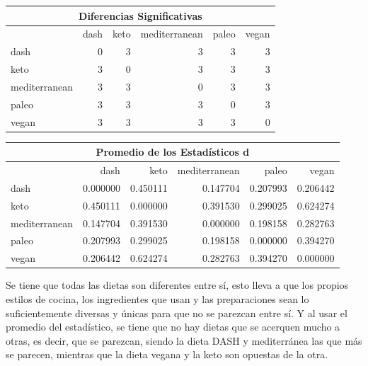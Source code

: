 \documentclass[12pt,a4paper]{article}
\begin{document}
{{            \begin{center}
                \begin{tabular}{lrrrrr}
                \toprule
                    \multicolumn{6}{c}{Diferencias Significativas} \\
                \midrule
                    & dash & keto & mediterranean & paleo & vegan \\
                \midrule
                    dash & 0 & 3 & 3 & 3 & 3 \\
                    keto & 3 & 0 & 3 & 3 & 3 \\
                    mediterranean & 3 & 3 & 0 & 3 & 3 \\
                    paleo & 3 & 3 & 3 & 0 & 3 \\
                    vegan & 3 & 3 & 3 & 3 & 0 \\
                \bottomrule
                \end{tabular}
            \end{center}
            
            \begin{center}
                \begin{tabular}{lrrrrr}
                \toprule
                    \multicolumn{6}{c}{Promedio de los Estadísticos d} \\
                \midrule
                    & dash & keto & mediterranean & paleo & vegan \\
                \midrule
                    dash          & 0.000000 & 0.450111 & 0.147704 & 0.207993 & 0.206442 \\
                    keto          & 0.450111 & 0.000000 & 0.391530 & 0.299025 & 0.624274 \\
                    mediterranean & 0.147704 & 0.391530 & 0.000000 & 0.198158 & 0.282763 \\
                    paleo         & 0.207993 & 0.299025 & 0.198158 & 0.000000 & 0.394270 \\
                    vegan         & 0.206442 & 0.624274 & 0.282763 & 0.394270 & 0.000000 \\
                \bottomrule
                \end{tabular}
            \end{center}

            Se tiene que todas las dietas son diferentes entre sí, esto lleva a que 
            los propios estilos de cocina, los ingredientes que usan y las preparaciones 
            sean lo suficientemente diversas y únicas para que no se parezcan entre sí. 
            Y al usar el promedio del estadístico, se tiene que no hay dietas que se acerquen 
            mucho a otras, es decir, que se parezcan, siendo la dieta DASH y mediterránea las 
            que más se parecen, mientras que la dieta vegana y la keto son opuestas de la otra. 
        }

}
\end{document}
